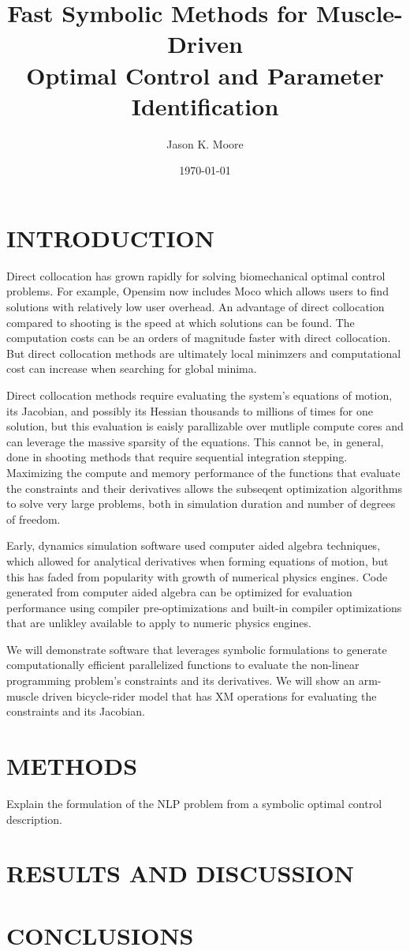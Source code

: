 \documentclass[11pt,twocolumn]{article}
\title{Fast Symbolic Methods for Muscle-Driven\\Optimal Control and Parameter
Identification}
\author{Jason K. Moore}
\date{\today}
\begin{document}
\maketitle
\section*{INTRODUCTION}
%
Direct collocation has grown rapidly for solving biomechanical optimal control
problems. For example, Opensim now includes Moco which allows users to find
solutions with relatively low user overhead. An advantage of direct collocation
compared to shooting is the speed at which solutions can be found.  The
computation costs can be an orders of magnitude faster with direct collocation.
But direct collocation methods are ultimately local minimzers and computational
cost can increase when searching for global minima.

Direct collocation methods require evaluating the system's equations of motion,
its Jacobian, and possibly its Hessian thousands to millions of times for one
solution, but this evaluation is eaisly parallizable over mutliple compute
cores and can leverage the massive sparsity of the equations. This cannot be,
in general, done in shooting methods that require sequential integration
stepping. Maximizing the compute and memory performance of the functions that
evaluate the constraints and their derivatives allows the subseqent optimization
algorithms to solve very large problems, both in simulation duration and number
of degrees of freedom.

Early, dynamics simulation software used computer aided algebra techniques,
which allowed for analytical derivatives when forming equations of motion, but
this has faded from popularity with growth of numerical physics engines. Code
generated from computer aided algebra can be optimized for evaluation
performance using compiler pre-optimizations and built-in compiler
optimizations that are unlikley available to apply to numeric physics engines.

We will demonstrate software that leverages symbolic formulations to generate
computationally efficient parallelized functions to evaluate the non-linear
programming problem's constraints and its derivatives. We will show an
arm-muscle driven bicycle-rider model that has XM operations for evaluating the
constraints and its Jacobian.

\section*{METHODS}
Explain the formulation of the NLP problem from a symbolic optimal control
description.

\section*{RESULTS AND DISCUSSION}

\section*{CONCLUSIONS}
\end{document}
